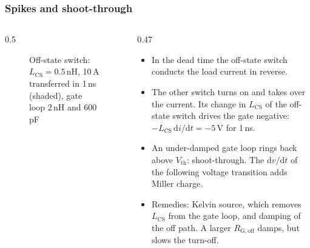 \begin{frame}
	\frametitle{Spikes and shoot-through}
	\begin{columns}[T]
		\begin{column}{0.5\textwidth}
			\begin{figure}
				\centering
				\caption{Off-state switch: $L_\mathrm{CS}=0.5$\,nH, 10\,A transferred in 1\,ns (shaded), gate loop 2\,nH and 600\,pF}
			\end{figure}
		\end{column}
		\begin{column}{0.47\textwidth}
			\small
			\begin{itemize}
				\item In the dead time the off-state switch conducts the load current in reverse.
				\item The other switch turns on and takes over the current. Its change in $L_\mathrm{CS}$ of the off-state switch drives the gate negative: $-L_\mathrm{CS}\,\mathrm{d}i/\mathrm{d}t=-5$\,V for 1\,ns.
				\item An under-damped gate loop rings back above $V_\mathrm{th}$: shoot-through. The $\mathrm{d}v/\mathrm{d}t$ of the following voltage transition adds Miller charge.
				\item Remedies: Kelvin source, which removes $L_\mathrm{CS}$ from the gate loop, and damping of the off path. A larger $R_\mathrm{G,off}$ damps, but slows the turn-off.
			\end{itemize}
		\end{column}
	\end{columns}
\end{frame}

